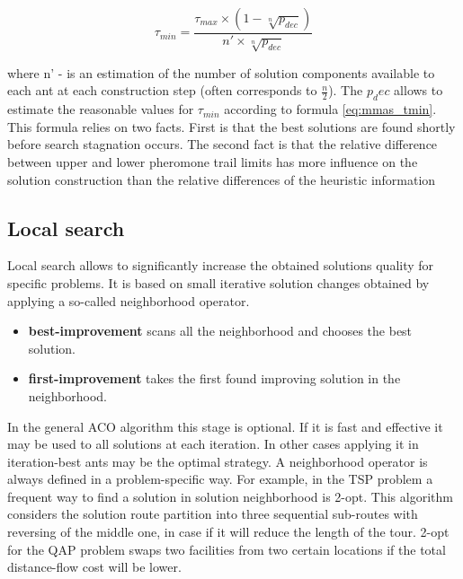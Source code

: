 \begin{equation}
\tau_{min} = \frac{\tau_{max} \times (1 - \sqrt[n]{p_{dec}})}{n' \times \sqrt[n]{p_{dec}}} 
\label{eq:mmas_tmin}
\end{equation}

where n' - is an estimation of the number of solution components available to each ant at each construction step (often corresponds to $\frac{n}{2}$). The $p_dec$ allows to estimate the reasonable values for $\tau_{min}$ according to formula \ref{eq:mmas_tmin}. This formula relies on two facts. First is that the best solutions are found shortly before search stagnation occurs. The second fact is that the relative difference between upper and lower pheromone trail limits has more influence on the solution construction than the relative differences of the heuristic information

\subsection{Local search}
Local search allows to significantly increase the obtained solutions quality for specific problems. It is based on small iterative solution changes obtained by applying a so-called neighborhood operator.

\begin{itemize}
\item \textbf{best-improvement} scans all the neighborhood and chooses the best solution.
\item \textbf{first-improvement} takes the first found improving solution in the neighborhood.
\end{itemize}

In the general ACO algorithm this stage is optional. If it is fast and effective it may be used to all solutions at each iteration. In other cases applying it in iteration-best ants may be the optimal strategy. A neighborhood operator is always defined in a problem-specific way. For example, in the TSP problem a frequent way to find a solution in solution neighborhood is 2-opt. This algorithm considers the solution route partition into three sequential sub-routes with reversing of the middle one, in case if it will reduce the length of the tour. 2-opt for the QAP problem swaps two facilities from two certain locations if the total distance-flow cost will be lower.



